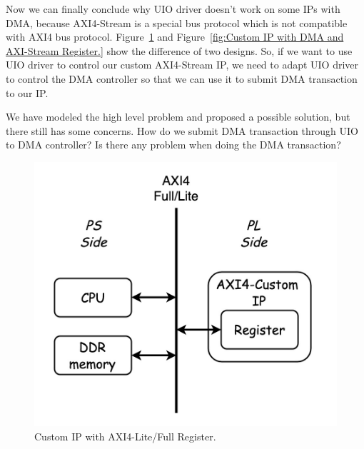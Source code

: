 Now we can finally conclude why UIO driver doesn't work on some IPs with DMA, because AXI4-Stream is a special bus protocol which is not compatible with AXI4 bus protocol. Figure~\ref{fig:Custom IP with AXI4-Lite/Full Register.} and Figure~\ref{fig:Custom IP with DMA and AXI-Stream Register.} show the difference of two designs. So, if we want to use UIO driver to control our custom AXI4-Stream IP, we need to adapt UIO driver to control the DMA controller so that we can use it to submit DMA transaction to our IP.

We have modeled the high level problem and proposed a possible solution, but there still has some concerns. How do we submit DMA transaction through UIO to DMA controller? Is there any problem when doing the DMA transaction? 


\newpage
\begin{figure}[!htb]
  \centering
  \includegraphics[scale=0.3]{images/customAXI4IP.jpg}
  \caption[Custom IP with AXI4-Lite/Full Register.]{Custom IP with AXI4-Lite/Full Register.}
  \label{fig:Custom IP with AXI4-Lite/Full Register.}
\end{figure}

